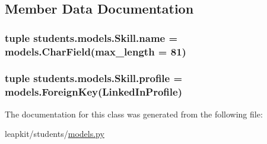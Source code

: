 \subsection{Member Data Documentation}
\hypertarget{classstudents_1_1models_1_1_skill_a5c22b1127793cd1ea56874c792f83c68}{
\subsubsection[{name}]{\setlength{\rightskip}{0pt plus 5cm}tuple students.\-models.\-Skill.\-name = models.\-Char\-Field(max\-\_\-length = 81)\hspace{0.3cm}{\ttfamily [static]}}}\label{classstudents_1_1models_1_1_skill_a5c22b1127793cd1ea56874c792f83c68}
\hypertarget{classstudents_1_1models_1_1_skill_aeb30b2427a9875143ebd154fd1a9503e}{
\subsubsection[{profile}]{\setlength{\rightskip}{0pt plus 5cm}tuple students.\-models.\-Skill.\-profile = models.\-Foreign\-Key({\bf Linked\-In\-Profile})\hspace{0.3cm}{\ttfamily [static]}}}\label{classstudents_1_1models_1_1_skill_aeb30b2427a9875143ebd154fd1a9503e}


The documentation for this class was generated from the following file\-:\begin{DoxyCompactItemize}
\item 
leapkit/students/\hyperlink{models_8py}{models.\-py}\end{DoxyCompactItemize}
